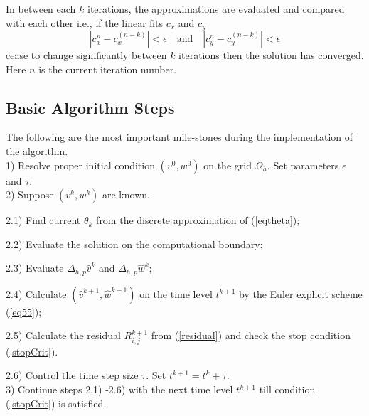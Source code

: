 \documentclass[preprint]{elsarticle}
\newcommand{\rf}[1]{(\ref{#1})}
\begin{document}
In between each $k$ iterations, the approximations are evaluated and compared with each other i.e., if the linear fits $c_{x}$ and $c_{y}$
\begin{equation}\label{stopCrit}
|c_{x}^{n} - c_{x}^{(n-k)}| < \epsilon \quad \textrm{and} \quad |c_{y}^{n} - c_{y}^{(n-k)}| < \epsilon
\end{equation}
cease to change significantly between $k$ iterations then the solution has converged. Here $n$ is the current iteration number.

\subsection{Basic Algorithm Steps}
The following are the most important mile-stones during the implementation of the algorithm.
\\
1) Resolve proper initial condition $(v^0, w^0)$ on the grid $\Omega_h$.  Set parameters $\epsilon$ and $\tau$.
\\
2) Suppose $(v^k, w^k)$ are known. 
\par
2.1) Find current $\theta_k$ from the discrete approximation of \rf{eqtheta};
\par
2.2) Evaluate the solution on the computational boundary;
\par
2.3) Evaluate $\Delta_{h,p}  \widehat{v}^k$ and $\Delta_{h,p}  \widehat{w}^k$;
\par
2.4) Calculate $(\widehat{v}^{k+1}, \widehat{w}^{k+1})$  on the  time level $t^{k+1}$ by the Euler explicit scheme   \rf{eq55};
\par
2.5) Calculate the residual $R^{k+1}_{i,j}$ from \rf{residual} and check the stop condition \rf{stopCrit}.
\par
2.6) Control the time step size $\tau$. Set $t^{k+1}=t^{k}+\tau$.
\\
3) Continue steps 2.1) -2.6) with the next time level $t^{k+1}$ till condition (\ref{stopCrit}) is satisfied.
\end{document}
